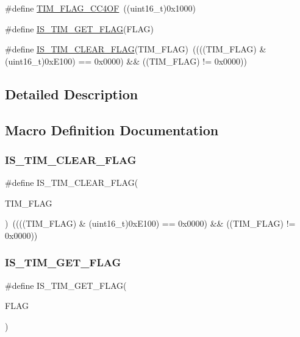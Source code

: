 \begin{DoxyCompactItemize}
\item 
\#define \mbox{\hyperlink{group___t_i_m___flags_gafc8b04654766d98ba2c6fed601895a20}{T\+I\+M\+\_\+\+F\+L\+A\+G\+\_\+\+C\+C4\+OF}}~((uint16\+\_\+t)0x1000)
\item 
\#define \mbox{\hyperlink{group___t_i_m___flags_ga6406de8131ae53ee29740c3e8627b098}{I\+S\+\_\+\+T\+I\+M\+\_\+\+G\+E\+T\+\_\+\+F\+L\+AG}}(F\+L\+AG)
\item 
\#define \mbox{\hyperlink{group___t_i_m___flags_gae60a1b5900de8354b2a4f017b2bd4f94}{I\+S\+\_\+\+T\+I\+M\+\_\+\+C\+L\+E\+A\+R\+\_\+\+F\+L\+AG}}(T\+I\+M\+\_\+\+F\+L\+AG)~((((T\+I\+M\+\_\+\+F\+L\+AG) \& (uint16\+\_\+t)0x\+E100) == 0x0000) \&\& ((\+T\+I\+M\+\_\+\+F\+L\+A\+G) != 0x0000))
\end{DoxyCompactItemize}


\subsection{Detailed Description}


\subsection{Macro Definition Documentation}
\mbox{\label{group___t_i_m___flags_gae60a1b5900de8354b2a4f017b2bd4f94}} 
\subsubsection{\texorpdfstring{IS\_TIM\_CLEAR\_FLAG}{IS\_TIM\_CLEAR\_FLAG}}
{\footnotesize\ttfamily \#define I\+S\+\_\+\+T\+I\+M\+\_\+\+C\+L\+E\+A\+R\+\_\+\+F\+L\+AG(\begin{DoxyParamCaption}\item[{}]{T\+I\+M\+\_\+\+F\+L\+AG }\end{DoxyParamCaption})~((((T\+I\+M\+\_\+\+F\+L\+AG) \& (uint16\+\_\+t)0x\+E100) == 0x0000) \&\& ((\+T\+I\+M\+\_\+\+F\+L\+A\+G) != 0x0000))}

\mbox{\label{group___t_i_m___flags_ga6406de8131ae53ee29740c3e8627b098}} 
\subsubsection{\texorpdfstring{IS\_TIM\_GET\_FLAG}{IS\_TIM\_GET\_FLAG}}
{\footnotesize\ttfamily \#define I\+S\+\_\+\+T\+I\+M\+\_\+\+G\+E\+T\+\_\+\+F\+L\+AG(\begin{DoxyParamCaption}\item[{}]{F\+L\+AG }\end{DoxyParamCaption})}

